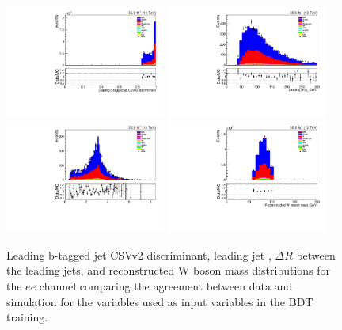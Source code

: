 \begin{figure}[htb]
\centering
\includegraphics[width=0.47\textwidth]{figs/background-estimation/plots/unblinded/prompt_ee_ttbarInc/bTagDisc_NPL_ee_wMass_ee.pdf}
\includegraphics[width=0.47\textwidth]{figs/background-estimation/plots/unblinded/prompt_ee_ttbarInc/leadingJetPt_NPL_ee_wMass_ee.pdf}
\\
\includegraphics[width=0.47\textwidth]{figs/background-estimation/plots/unblinded/prompt_ee_ttbarInc/jjDelR_NPL_ee_wMass_ee.pdf}
\includegraphics[width=0.47\textwidth]{figs/background-estimation/plots/unblinded/prompt_ee_ttbarInc/wPairMass_NPL_ee_wMass_ee.pdf}
\caption{
Leading b-tagged jet CSVv2 discriminant, leading jet \pT, $\Delta R$ between the leading jets, and reconstructed W boson mass distributions for the $ee$ channel comparing the agreement between data and simulation for the variables used as input variables in the BDT training.}
\label{fig:inputFeaturesDataSimAgreement1}
\end{figure}

